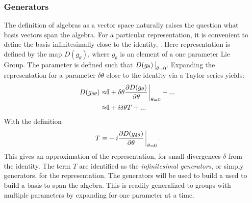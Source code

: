 \subsubsection{Generators}\label{sec:generators}
The definition of algebras as a vector space naturally raises the question what basis vectors span the algebra.
For a particular representation, it is convenient to define the basis infinitesimally close to the identity, \ident.
Here representation is defined by the map $D(g_{\theta})$, where $g_{\theta}$ is an element of a one parameter Lie Group.
The parameter is defined such that $D(g_{\theta})\eval_{\theta=0}$.
Expanding the representation for a parameter $\delta\theta$ close to the identity via a Taylor series yields:
\begin{equation}\begin{split}\label{eqn:taylorRep}
    D(g_{\delta\theta})\approx&\mathbb{I}+\delta\theta\frac{\partial D(g_{\theta})}{\partial\theta}\eval_{\theta=0} +...\\
    \approx&\mathbb{I}+i\delta\theta T+... \\
\end{split}\end{equation}
With the definition
\begin{equation}\begin{split}\label{eqn:generator}
    T\equiv&-i\frac{\partial D(g_{\delta\theta})}{\partial\theta}\eval_{\theta=0}. \\
\end{split}\end{equation} 
This gives an approximation of the representation, for small divergences $\delta$ from the identity.
The term $T$ are identified as the \emph{infinitesimal generators}, or simply generators, for the representation.
The generators will be used to build a used to build a basis to span the algebra.
This is readily generalized to groups with multiple parameters by expanding for one parameter at a time.

